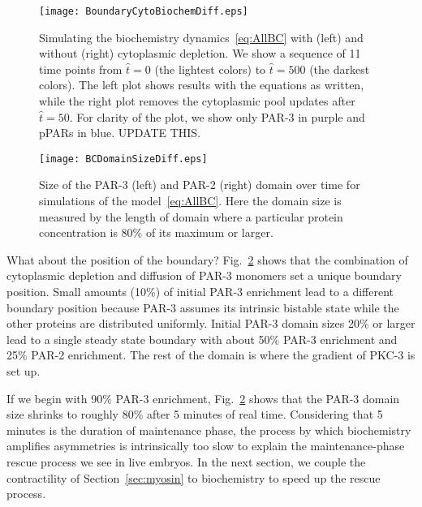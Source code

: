 \documentclass[11pt]{article}
\newcommand{\red}[1]{\color{red}#1\normalcolor}
\newcommand{\6}[1]{#1_{\text{6}}}
\newcommand{\3}[1]{#1_{\text{3}}}
\begin{document}
\begin{figure}
\centering
\texttt{[image: BoundaryCytoBiochemDiff.eps]}
\caption{\label{fig:BoundaryDiff}Simulating the biochemistry dynamics\ \eqref{eq:AllBC} with (left) and without (right) cytoplasmic depletion. We show a sequence of 11 time points from $\hat t = 0$ (the lightest colors) to $\hat t = 500$ (the darkest colors). The left plot shows results with the equations as written, while the right plot removes the cytoplasmic pool updates after $\hat t = 50$. For clarity of the plot, we show only PAR-3 in purple and pPARs in blue. \red{UPDATE THIS.}}
\end{figure}

\begin{figure}
\centering
\texttt{[image: BCDomainSizeDiff.eps]}
\caption{\label{fig:BCDSD} Size of the PAR-3 (left) and PAR-2 (right) domain over time for simulations of the model\ \eqref{eq:AllBC}. Here the domain size is measured by the length of domain where a particular protein concentration is 80\% of its maximum or larger. }
\end{figure}


What about the position of the boundary? Fig.\ \ref{fig:BCDSD} shows that the combination of cytoplasmic depletion and diffusion of PAR-3 monomers set a unique boundary position. Small amounts (10\%) of initial PAR-3 enrichment lead to a different boundary position because PAR-3 assumes its intrinsic bistable state while the other proteins are distributed uniformly. Initial PAR-3 domain sizes 20\% or larger lead to a single steady state boundary with about 50\% PAR-3 enrichment and 25\% PAR-2 enrichment. The rest of the domain is where the gradient of PKC-3 is set up.

If we begin with 90\% PAR-3 enrichment, Fig.\ \ref{fig:BCDSD} shows that the PAR-3 domain size shrinks to roughly 80\% after 5 minutes of real time. Considering that 5 minutes is the duration of maintenance phase, the process by which biochemistry amplifies asymmetries is intrinsically too slow to explain the maintenance-phase rescue process we see in live embryos. In the next section, we couple the contractility of Section\ \ref{sec:myosin} to biochemistry to speed up the rescue process. 
\end{document}
